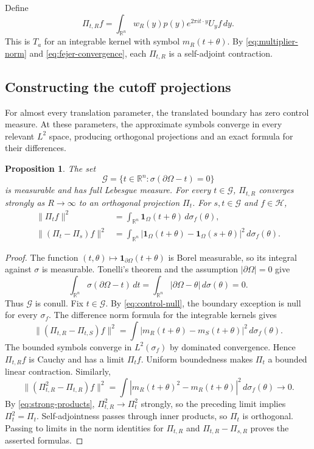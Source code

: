 \documentclass[a4paper,12pt,reqno]{amsart}
\newcommand{\lead}[1]{\par\smallskip\noindent\leavevmode#1\par\smallskip}
\newtheorem{proposition}[theorem]{Proposition}
\theoremstyle{remark}
\numberwithin{equation}{section}
\newcommand{\R}{\mathbb R}
\newcommand{\Hh}{\mathcal H}
\newcommand{\one}{\mathbf 1}
\begin{document}
Define
\begin{equation}\label{eq:finite-Pi}
 \Pi_{t,R}f=\int_{\R^n}w_R(y)p(y)e^{2\pi it\cdot y}U_yf\,dy.
\end{equation}
This is $T_a$ for an integrable kernel with symbol $m_R(t+\theta)$.
By \eqref{eq:multiplier-norm} and \eqref{eq:fejer-convergence}, each
$\Pi_{t,R}$ is a self-adjoint contraction.

\subsection{Constructing the cutoff projections}

\lead{For almost every translation parameter, the translated boundary
has zero control measure. At these parameters, the approximate symbols
converge in every relevant $L^2$ space, producing orthogonal projections
and an exact formula for their differences.}


\begin{proposition}\label{prop:cutoffs}
The set
\begin{equation}\label{eq:good-t}
 \mathcal G=\{t\in\R^n:\sigma(\partial\Omega-t)=0\}
\end{equation}
is measurable and has full Lebesgue measure. For every $t\in\mathcal G$,
$\Pi_{t,R}$ converges strongly as $R\to\infty$ to an orthogonal
projection $\Pi_t$. For $s,t\in\mathcal G$ and $f\in\Hh$,
\begin{align}
 \|\Pi_tf\|^2
 &=\int_{\R^n}\one_\Omega(t+\theta)\,d\sigma_f(\theta),
 \label{eq:Pi-norm}\\
 \|(\Pi_t-\Pi_s)f\|^2
 &=\int_{\R^n}|\one_\Omega(t+\theta)-\one_\Omega(s+\theta)|^2
       \,d\sigma_f(\theta).
 \label{eq:Pi-difference}
\end{align}
\end{proposition}

\begin{proof}
The function $(t,\theta)\mapsto\one_{\partial\Omega}(t+\theta)$ is
Borel measurable, so its integral against $\sigma$ is measurable.
Tonelli's theorem and the assumption $|\partial\Omega|=0$ give
\begin{equation}\label{eq:good-ae}
 \int_{\R^n}\sigma(\partial\Omega-t)\,dt
 =\int_{\R^n}|\partial\Omega-\theta|\,d\sigma(\theta)=0.
\end{equation}
Thus $\mathcal G$ is conull. Fix $t\in\mathcal G$. By
\eqref{eq:control-null}, the boundary exception is null for every
$\sigma_f$. The difference norm formula for the integrable kernels gives
\[
 \|(\Pi_{t,R}-\Pi_{t,S})f\|^2
 =\int|m_R(t+\theta)-m_S(t+\theta)|^2\,d\sigma_f(\theta).
\]
The bounded symbols converge in $L^2(\sigma_f)$ by dominated convergence.
Hence $\Pi_{t,R}f$ is Cauchy and has a limit $\Pi_tf$. Uniform boundedness
makes $\Pi_t$ a bounded linear contraction. Similarly,
\[
 \|(\Pi_{t,R}^2-\Pi_{t,R})f\|^2
 =\int|m_R(t+\theta)^2-m_R(t+\theta)|^2\,d\sigma_f(\theta)
 \longrightarrow0.
\]
By \eqref{eq:strong-products}, $\Pi_{t,R}^2\to\Pi_t^2$ strongly,
so the preceding limit implies $\Pi_t^2=\Pi_t$. Self-adjointness passes
through inner products, so $\Pi_t$ is orthogonal. Passing to limits in the norm identities for
$\Pi_{t,R}$ and $\Pi_{t,R}-\Pi_{s,R}$ proves the asserted formulas.
\end{proof}
\end{document}
